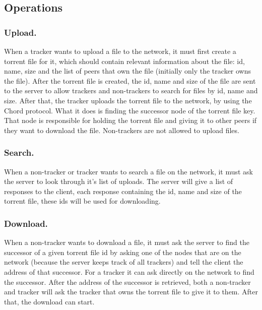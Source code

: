 \documentclass[runningheads]{llncs}
\begin{document}
\subsection{Operations} \label{operations}
\subsubsection{Upload.}
When a tracker wants to upload a file to the network, it must first create a torrent file for it, which should contain relevant information about the file: id, name, size and the list of peers that own the file (initially only the tracker owns the file). After the torrent file is created, the id, name and size of the file are sent to the server to allow trackers and non-trackers to search for files by id, name and size. After that, the tracker uploads the torrent file to the network, by using the Chord protocol. What it does is finding the successor node of the torrent file key. That node is responsible for holding the torrent file and giving it to other peers if they want to download the file. Non-trackers are not allowed to upload files.
\subsubsection{Search.}
When a non-tracker or tracker wants to search a file on the network, it must ask the server to look through it's list of uploads. The server will give a list of responses to the client, each response containing the id, name and size of the torrent file, these ids will be used for downloading.
\subsubsection{Download.}
When a non-tracker wants to download a file, it must ask the server to find the successor of a given torrent file id by asking one of the nodes that are on the network (because the server keeps track of all trackers) and tell the client the address of that successor. For a tracker it can ask directly on the network to find the successor. After the address of the successor is retrieved, both a non-tracker and tracker will ask the tracker that owns the torrent file to give it to them. After that, the download can start.
\end{document}
